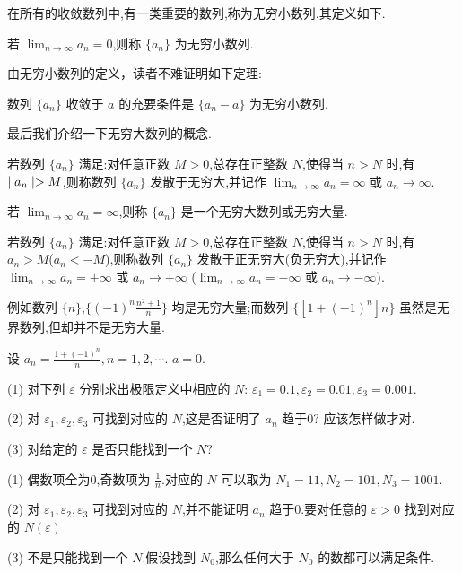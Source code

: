在所有的收敛数列中,有一类重要的数列,称为无穷小数列.其定义如下.

\begin{definition}[无穷小数列]
    若 $\lim_{n\to\infty} a_n=0$,则称 $\{a_n\}$ 为无穷小数列. 
\end{definition}

由无穷小数列的定义，读者不难证明如下定理:

\begin{theorem}\label{thm:small}
    数列 $\{a_n\}$ 收敛于 $a$ 的充要条件是 $\{a_n-a\}$ 为无穷小数列.
\end{theorem}

最后我们介绍一下无穷大数列的概念.

\begin{definition}[无穷大数列]
    若数列 $\{a_n\}$ 满足:对任意正数 $M>0$,总存在正整数 $N$,使得当 $n>N$ 时,有 $\mid a_n \mid>M$,则称数列 $\{a_n\}$ 发散于无穷大,并记作 $\lim_{n\to\infty}a_n=\infty$ 或 $a_n\to \infty$.
\end{definition}

\begin{annotation}
    若 $\lim_{n\to\infty}a_n=\infty$,则称 $\{a_n\}$ 是一个无穷大数列或无穷大量.
\end{annotation}

\begin{definition}
    若数列 $\{a_n\}$ 满足:对任意正数 $M>0$,总存在正整数 $N$,使得当 $n>N$ 时,有 $a_n>M$($a_n<-M$),则称数列 $\{a_n\}$ 发散于正无穷大(负无穷大),并记作 $\lim_{n\to\infty}a_n=+\infty$ 或 $a_n\to +\infty$ ($\lim_{n\to\infty}a_n=-\infty$ 或 $a_n\to -\infty$).
\end{definition}

例如数列 $\{n\}$,$\{(-1)^n\frac{n^2+1}{n}\}$ 均是无穷大量;而数列 $\{[1+(-1)^n]n\}$ 虽然是无界数列,但却并不是无穷大量.

\homework

\begin{practice}
    设 $a_n=\frac{1+(-1)^n}{n},n=1,2,\cdots$. $a=0$.

    (1) 对下列 $\varepsilon$ 分别求出极限定义中相应的 $N$: $\varepsilon_1=0.1,\varepsilon_2=0.01,\varepsilon_3=0.001$.

    (2) 对 $\varepsilon_1,\varepsilon_2,\varepsilon_3$ 可找到对应的 $N$,这是否证明了 $a_n$ 趋于0? 应该怎样做才对.

    (3) 对给定的 $\varepsilon$ 是否只能找到一个 $N$?
\end{practice}

\begin{solve}
    (1) 偶数项全为0,奇数项为 $\frac{1}{n}$.对应的 $N$ 可以取为 $N_1=11,N_2=101,N_3=1001$.

    (2) 对 $\varepsilon_1,\varepsilon_2,\varepsilon_3$ 可找到对应的 $N$,并不能证明 $a_n$ 趋于0.要对任意的 $\varepsilon>0$ 找到对应的 $N(\varepsilon)$ 

    (3) 不是只能找到一个 $N$.假设找到 $N_0$,那么任何大于 $N_0$ 的数都可以满足条件.
\end{solve}

